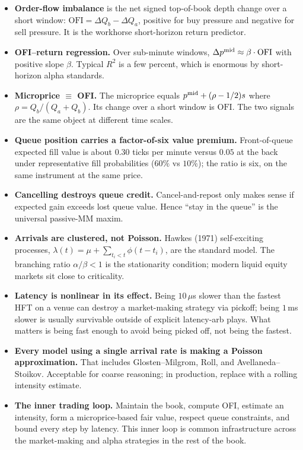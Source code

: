 \begin{itemize}
  \item \textbf{Order-flow imbalance} is the net signed
  top-of-book depth change over a short window:
  $\mathrm{OFI} = \Delta Q_b - \Delta Q_a$, positive for buy
  pressure and negative for sell pressure. It is the workhorse
  short-horizon return predictor.
  \item \textbf{OFI--return regression.} Over sub-minute
  windows, $\Delta p^{\mathrm{mid}} \approx \beta \cdot \mathrm{OFI}$ with
  positive slope $\beta$. Typical $R^2$ is a few percent, which
  is enormous by short-horizon alpha standards.
  \item \textbf{Microprice $\equiv$ OFI.} The microprice
  equals $p^{\mathrm{mid}} + (\rho - 1/2)s$ where
  $\rho = Q_b/(Q_a+Q_b)$. Its change over a short window is
  $\mathrm{OFI}$. The two signals are the same object at
  different time scales.
  \item \textbf{Queue position carries a factor-of-six value
  premium.} Front-of-queue expected fill value is about
  $0.30$ ticks per minute versus $0.05$ at the back under
  representative fill probabilities ($60\%$ vs $10\%$); the
  ratio is six, on the same instrument at the same price.
  \item \textbf{Cancelling destroys queue credit.} Cancel-and-repost
  only makes sense if expected gain exceeds lost queue value.
  Hence ``stay in the queue'' is the universal passive-MM maxim.
  \item \textbf{Arrivals are clustered, not Poisson.} Hawkes
  (1971) self-exciting processes,
  $\lambda(t) = \mu + \sum_{t_i < t} \phi(t - t_i)$, are the
  standard model. The branching ratio $\alpha/\beta < 1$ is the
  stationarity condition; modern liquid equity markets sit
  close to criticality.
  \item \textbf{Latency is nonlinear in its effect.} Being
  $10\,\mu$s slower than the fastest HFT on a venue can
  destroy a market-making strategy via pickoff; being
  $1$\,ms slower is usually survivable outside of explicit
  latency-arb plays. What matters is being fast enough to
  avoid being picked off, not being the fastest.
  \item \textbf{Every model using a single arrival rate is making
  a Poisson approximation.} That includes Glosten--Milgrom, Roll,
  and Avellaneda--Stoikov. Acceptable for coarse reasoning; in
  production, replace with a rolling intensity estimate.
  \item \textbf{The inner trading loop.} Maintain the book,
  compute OFI, estimate an intensity, form a microprice-based
  fair value, respect queue constraints, and bound every step
  by latency. This inner loop is common infrastructure across
  the market-making and alpha strategies in the rest of the
  book.
\end{itemize}

